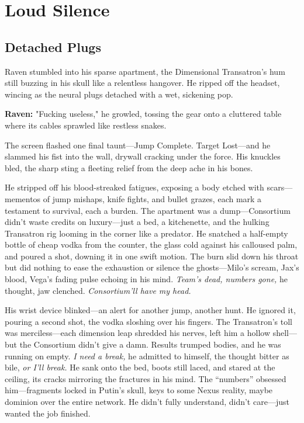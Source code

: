 \documentclass[12pt]{book}
\begin{document}
\chapter{Loud Silence}
\section{Detached Plugs}

Raven stumbled into his sparse apartment, the Dimensional Transatron’s hum still buzzing in his skull like a relentless hangover. He ripped off the headset, wincing as the neural plugs detached with a wet, sickening pop.

\vspace{0.5em}
\textbf{Raven:} "Fucking useless," he growled, tossing the gear onto a cluttered table where its cables sprawled like restless snakes.

The screen flashed one final taunt---Jump Complete. Target Lost---and he slammed his fist into the wall, drywall cracking under the force. His knuckles bled, the sharp sting a fleeting relief from the deep ache in his bones.

He stripped off his blood-streaked fatigues, exposing a body etched with scars---mementos of jump mishaps, knife fights, and bullet grazes, each mark a testament to survival, each a burden. The apartment was a dump---Consortium didn’t waste credits on luxury---just a bed, a kitchenette, and the hulking Transatron rig looming in the corner like a predator. He snatched a half-empty bottle of cheap vodka from the counter, the glass cold against his calloused palm, and poured a shot, downing it in one swift motion. The burn slid down his throat but did nothing to ease the exhaustion or silence the ghosts---Milo’s scream, Jax’s blood, Vega’s fading pulse echoing in his mind. \textit{Team’s dead, numbers gone,} he thought, jaw clenched. \textit{Consortium’ll have my head.}

His wrist device blinked---an alert for another jump, another hunt. He ignored it, pouring a second shot, the vodka sloshing over his fingers. The Transatron’s toll was merciless---each dimension leap shredded his nerves, left him a hollow shell---but the Consortium didn’t give a damn. Results trumped bodies, and he was running on empty. \textit{I need a break,} he admitted to himself, the thought bitter as bile, \textit{or I’ll break.} He sank onto the bed, boots still laced, and stared at the ceiling, its cracks mirroring the fractures in his mind. The “numbers” obsessed him---fragments locked in Putin’s skull, keys to some Nexus reality, maybe dominion over the entire network. He didn’t fully understand, didn’t care---just wanted the job finished.
\end{document}
